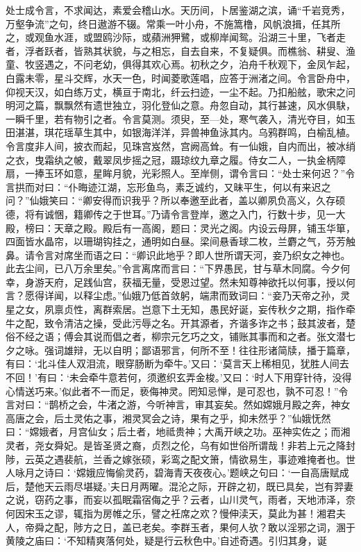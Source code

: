 \documentclass[a4paper,12pt,UTF8,twoside]{ctexbook}
\begin{document}
处士成令言，不求闻达，素爱会稽山水。天历间，卜居鉴湖之滨，诵“千岩竞秀，万壑争流”之句，终日遨游不辍。常乘一叶小舟，不施篙橹，风帆浪揖，任其所之，或观鱼水涯，或盟鸥沙际，或蘋洲狎鷺，或柳岸闻鸳。沿湖三十里，飞者走者，浮者跃者，皆熟其状貌，与之相忘，自去自来，不复疑俱。而樵翁、耕叟、渔童、牧竖遇之，不问老幼，俱得其欢心焉。初秋之夕，泊舟千秋观下，金凤乍起，白露未零，星斗交辉，水天一色，时闻菱歌莲唱，应答于洲渚之间。令言卧舟中，仰视天汉，如白练万丈，横亘于南北，纤云扫迹，一尘不起。乃扣船舷，歌宋之问明河之篇，飘飘然有遗世独立，羽化登仙之意。舟忽自动，其行甚速，风水俱駃，一瞬千里，若有物引之者。令言莫测。须臾，至—处，寒气袭入，清光夺目，如玉田湛湛，琪花瑶草生其中，如银海洋洋，异兽神鱼泳其内。乌鸦群鸣，白榆乱植。令言度非人间，披衣而起，见珠宫岌然，宫阙高耸。有一仙娥，自内而出，被冰绡之衣，曳霜纨之帔，戴翠凤步摇之冠，蹑琼纹九章之履。侍女二人，一执金柄障扇，一捧玉环如意，星眸月貌，光彩照人。至岸侧，谓令言曰：“处士来何迟？”令言拱而对曰：“仆晦迹江湖，忘形鱼鸟，素乏诚约，又昧平生，何以有来迟之问？”仙娥笑曰：“卿安得而识我乎？所以奉邀至此者，盖以卿夙负高义，久存硕德，将有诚悃，籍卿传之于世耳。”乃请令言登岸，邀之入门，行数十步，见一大殿，榜曰：天章之殿。殿后有一高阁，题曰：灵光之阁。内设云母屏，铺玉华箪，四面皆水晶帘，以珊瑚钩挂之，通明如白昼。梁间悬香球二枚，兰麝之气，芬芳触鼻。请令言对席坐而语之曰：“卿识此地乎？即人世所谓天河，妾乃织女之神也。此去尘间，已八万余里矣。”令言离席而言曰：“下界愚民，甘与草木同腐。今夕何幸，身游天府，足践仙宫，获福无量，受恩过望。然未知尊神欲托以何事，授以何言？愿得详闻，以释尘虑。”仙娥乃低首敛躬，端肃而致词曰：“妾乃天帝之孙，灵星之女，夙禀贞性，离群索居。岂意下土无知，愚民好诞，妄传秋夕之期，指作牵牛之配，致令清洁之操，受此污辱之名。开其源者，齐谐多诈之书；鼓其波者，楚俗不经之语；傅会其说而倡之者，柳宗元乞巧之文，铺账其事而和之者。张文潜七夕之咏。强词雄辩，无以自明；鄙语邪言，何所不至！往往形诸简牍，播于篇章，有曰：‘北斗佳人双泪流，眼穿肠断为牵牛。’又曰：‘莫言天上稀相见，犹胜人间去不回！’有曰：‘未会牵牛意若何，须邀织玄弄金梭。’又曰：‘时人下用穿针待，没得心情送巧来。’似此者不一而足，亵侮神灵。罔知忌惮，是可忍也，孰不可忍！”令言对曰：“鹊桥之会，牛渚之游，今听神言，审其妄矣。然如嫦娥月殿之奔，神女高唐之会，后土灵佑之事，湘灵冥会之诗，果有之乎，抑未然乎？”仙娥怃然曰：“嫦娥者，月宫仙女；后土者，地祗贵神；大禹开峡之功。巫神实佐之；而湘灵者，尧女舜妃。是皆圣贤之裔，贞烈之伦，乌有如世俗所谓哉！非若上元之降封陟，云英之遇裴航，兰香之嫁张硕，彩鸾之配文箫，情欲易生，事迹难掩者也。世人咏月之诗曰：‘嫦娥应悔偷灵药，碧海青天夜夜心。’题峡之句曰：‘一自高唐赋成后，楚他天云雨尽堪疑。’夫日月两曜。混沦之际，开辟之初，既已具矣，岂有羿妻之说，窃药之事，而妄以孤眠霜宿侮之乎？云者，山川灵气，雨者，天地沛泽，奈何因宋玉之谬，辄指为房帷之乐，譬之衽席之欢？慢伸渎天，莫此为甚！湘君夫人，帝舜之配，陟方之日，盖已老矣。李群玉者，果何人欤？敢以淫邪之词，溷于黄陵之庙曰：‘不知精爽落何处，疑是行云秋色中。’自述奇遇。引归其身，诞
\end{document}
